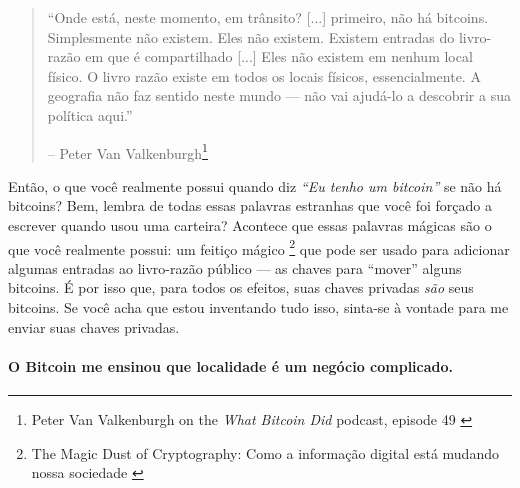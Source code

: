\begin{quotation}\begin{samepage}
\enquote{Onde está, neste momento, em trânsito? [...] primeiro, não há bitcoins. Simplesmente não existem. Eles não existem. Existem entradas do livro-razão em  que é compartilhado [...] Eles não existem em nenhum local físico. O livro razão existe em todos os locais físicos, essencialmente. A geografia não faz sentido neste mundo --- não vai ajudá-lo a descobrir a sua política aqui.}
\begin{flushright} -- Peter Van Valkenburgh\footnote{Peter Van Valkenburgh on the \textit{What Bitcoin Did} podcast, episode 49 \cite{wbd049}}
\end{flushright}\end{samepage}\end{quotation}

Então, o que você realmente possui quando diz \textit{\enquote{Eu tenho um bitcoin}} se não há bitcoins? Bem, lembra de todas essas palavras estranhas que você foi forçado a escrever quando usou uma carteira? Acontece que essas palavras mágicas são o que você realmente possui: um feitiço mágico \footnote{The Magic Dust of Cryptography: Como a informação digital está mudando nossa sociedade \cite{gigi:magic-spell}} que pode ser usado para adicionar algumas entradas ao livro-razão público --- as chaves para \enquote{mover} alguns bitcoins. É por isso que, para todos os efeitos, suas chaves privadas \textit{são} seus bitcoins. Se você acha que estou inventando tudo isso, sinta-se à vontade para me enviar suas chaves privadas.

\paragraph{O Bitcoin me ensinou que localidade é um negócio complicado.}

%
%
%
%
%
%
%
